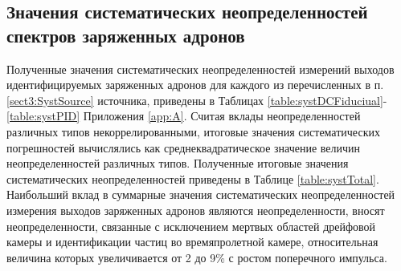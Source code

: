 \subsection{Значения систематических неопределенностей спектров заряженных адронов} \label{sect3:SystValues}
Полученные значения систематических неопределенностей измерений выходов идентифицируемых заряженных адронов для каждого из перечисленных в п.\ref{sect3:SystSource} источника, приведены в Таблицах \ref{table:systDCFiduciual}-\ref{table:systPID} Приложения \ref{app:A}.
Считая вклады неопределенностей различных типов некоррелированными, итоговые значения систематических погрешностей вычислялись как  среднеквадратическое значение величин неопределенностей различных типов. Полученные итоговые значения систематических неопределенностей приведены в Таблице \ref{table:systTotal}.
Наибольший вклад в суммарные значения систематических неопределенностей  измерения выходов заряженных адронов являются неопределенности, вносят неопределенности, связанные с исключением мертвых областей дрейфовой камеры и идентификации частиц во времяпролетной камере, относительная величина которых увеличивается от 2 до 9\% с ростом поперечного импульса. 

